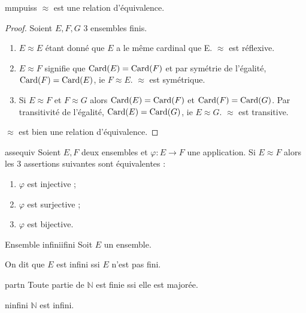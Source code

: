 \documentclass[a4paper,french,final]{memoir}
\begin{document}
\begin{theoremb}{}{mmpuiss}
    $ \mathrel{\approx}$ est une relation d'équivalence. 
\end{theoremb}

\begin{proof}
    Soient $E, F, G$ 3 ensembles finis.
	\begin{enumerate} 
		\item $E \mathrel{\approx} E$ étant donné que $E$ a le même cardinal que E. $\mathrel{\approx}$ est réflexive.
		\item $E \mathrel{\approx} F$ signifie que $ \operatorname{Card}(E) = \operatorname{Card}(F)$ et par symétrie de l'égalité, $\operatorname{Card}(F) = \operatorname{Card}(E)$, ie $F \mathrel{\approx} E$. $\mathrel{\approx}$ est symétrique. 
		\item Si $E \mathrel{\approx} F$ et $F \mathrel{\approx} G$ alors $\operatorname{Card}(E) = \operatorname{Card}(F)$ et $\operatorname{Card}(F) = \operatorname{Card}(G)$. Par transitivité de l'égalité, $\operatorname{Card}(E) = \operatorname{Card}(G)$, ie $E \mathrel{\approx} G$. $\mathrel{\approx}$ est transitive. 
	\end{enumerate}
	$\mathrel{\approx}$ est bien une relation d'équivalence.
\end{proof}

\begin{theoremb}{}{assequiv}
	Soient $E, F$ deux ensembles et $\varphi : E \to F$ une application. Si $E \mathrel{\approx} F$ alors les 3 assertions suivantes sont équivalentes :
	
	\begin{enumerate}
		\item $\varphi$ est injective ;
		\item $\varphi$ est surjective ;
		\item $\varphi$ est bijective. 
	\end{enumerate}
\end{theoremb}

\begin{defb}{Ensemble infini}{ifini}
	Soit $E$ un ensemble.
	
	On dit que $E$ est infini ssi $E$ n'est pas fini.
\end{defb}

\begin{theoremb}{}{partn} 
	Toute partie de $\mathbb{N}$ est finie ssi elle est majorée. 
\end{theoremb}



\begin{theoremb}{}{ninfini}
	$\mathbb{N}$ est infini. 
\end{theoremb}
\end{document}
